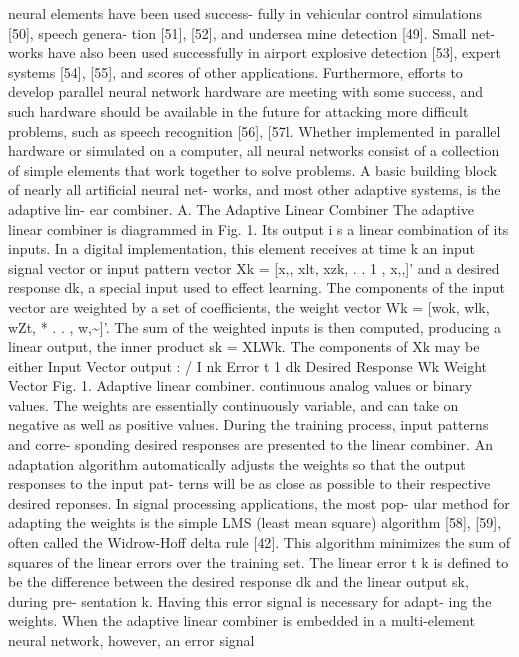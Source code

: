 neural elements have been used success- fully in vehicular control
simulations {[}50{]}, speech genera- tion {[}51{]}, {[}52{]}, and
undersea mine detection {[}49{]}. Small net- works have also been used
successfully in airport explosive detection {[}53{]}, expert systems
{[}54{]}, {[}55{]}, and scores of other applications. Furthermore,
efforts to develop parallel neural network hardware are meeting with
some success, and such hardware should be available in the future for
attacking more difficult problems, such as speech recognition {[}56{]},
{[}57l. Whether implemented in parallel hardware or simulated on a
computer, all neural networks consist of a collection of simple elements
that work together to solve problems. A basic building block of nearly
all artificial neural net- works, and most other adaptive systems, is
the adaptive lin- ear combiner. A. The Adaptive Linear Combiner The
adaptive linear combiner is diagrammed in Fig. 1. Its output i s a
linear combination of its inputs. In a digital implementation, this
element receives at time k an input signal vector or input pattern
vector Xk = {[}x,, xlt, xzk, . . 1 , x,,{]}' and a desired response dk,
a special input used to effect learning. The components of the input
vector are weighted by a set of coefficients, the weight vector Wk =
{[}wok, wlk, wZt, * . . , w,\textasciitilde{]}'. The sum of the weighted
inputs is then computed, producing a linear output, the inner product sk
= XLWk. The components of Xk may be either Input Vector output : / I nk
Error t 1 dk Desired Response Wk Weight Vector Fig. 1. Adaptive linear
combiner. continuous analog values or binary values. The weights are
essentially continuously variable, and can take on negative as well as
positive values. During the training process, input patterns and corre-
sponding desired responses are presented to the linear combiner. An
adaptation algorithm automatically adjusts the weights so that the
output responses to the input pat- terns will be as close as possible to
their respective desired reponses. In signal processing applications,
the most pop- ular method for adapting the weights is the simple LMS
(least mean square) algorithm {[}58{]}, {[}59{]}, often called the
Widrow-Hoff delta rule {[}42{]}. This algorithm minimizes the sum of
squares of the linear errors over the training set. The linear error t k
is defined to be the difference between the desired response dk and the
linear output sk, during pre- sentation k. Having this error signal is
necessary for adapt- ing the weights. When the adaptive linear combiner
is embedded in a multi-element neural network, however, an error signal
